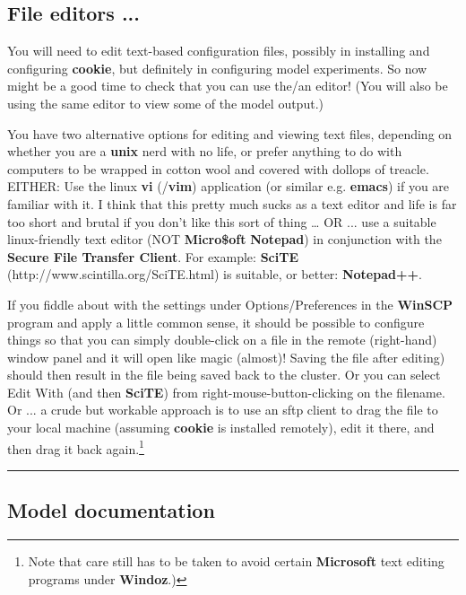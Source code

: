 \subsection*{File editors ...}

You will need to edit text-based configuration files, possibly in installing and configuring \textbf{cookie}, but definitely in configuring model experiments. So now might be a good time to check that you can use the/an editor! (You will also be using the same editor to view some of the model output.)

You have two alternative options for editing and viewing text files, depending on whether you are a \textbf{unix} nerd with no life, or prefer anything to do with computers to be wrapped in cotton wool and covered with dollops of treacle.
EITHER: Use the linux \textbf{vi} (/\textbf{vim}) application (or similar e.g. \textbf{emacs}) if you are familiar with it. I think that this pretty much sucks as a text editor and life is far too short and brutal if you don't like this sort of thing … OR ... use a suitable linux-friendly text editor (NOT \textbf{Micro\$oft} \textbf{Notepad}) in conjunction with the \textbf{Secure File Transfer Client}. For example: \textbf{SciTE} (http://www.scintilla.org/SciTE.html) is suitable, or better: \textbf{Notepad++}.

If you fiddle about with the settings under Options/Preferences in the \textbf{WinSCP} program and apply a little common sense, it should be possible to configure things so that you can simply double-click on a file in the remote (right-hand) window panel and it will open like magic (almost)! Saving the file after editing) should then result in the file being saved back to the cluster. Or you can select Edit With (and then \textbf{SciTE}) from right-mouse-button-clicking on the filename. Or ... a crude but workable approach is to use an sftp client to drag the file to your local machine (assuming \textbf{cookie} is installed remotely), edit it there, and then drag it back again.\footnote{Note that care still has to be taken to avoid certain \textbf{Microsoft} text editing programs under \textbf{Windoz}.)}

\vspace{1mm}\noindent\rule{4cm}{0.5pt}\vspace{2mm}

\subsection*{Model documentation}

